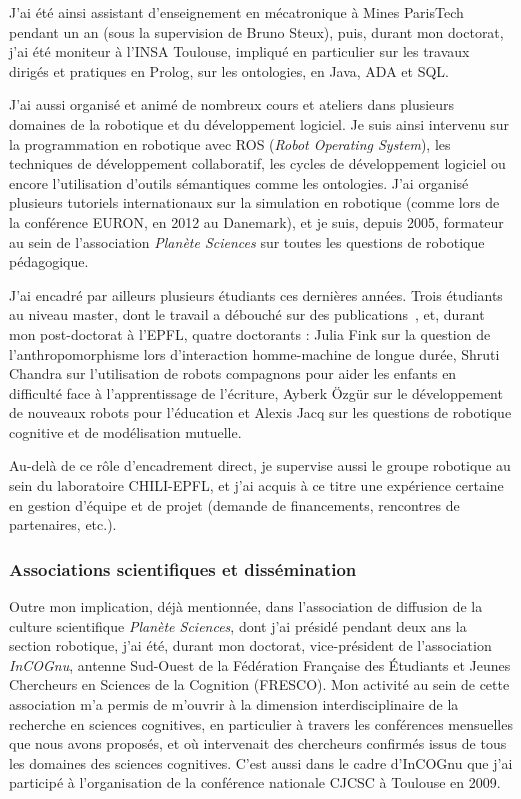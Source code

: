 \documentclass[a4paper]{article}
\begin{document}
J'ai été ainsi assistant d'enseignement en mécatronique à Mines ParisTech
pendant un an (sous la supervision de Bruno Steux), puis, durant mon doctorat,
j'ai été moniteur à l'INSA Toulouse, impliqué en particulier sur les travaux
dirigés et pratiques en Prolog, sur les ontologies, en Java, ADA et SQL.

J'ai aussi organisé et animé de nombreux cours et ateliers dans plusieurs
domaines de la robotique et du développement logiciel. Je suis ainsi intervenu
sur la programmation en robotique avec ROS (\emph{Robot Operating System}), les
techniques de développement collaboratif, les cycles de développement logiciel
ou encore l'utilisation d'outils sémantiques comme les ontologies. J'ai organisé
plusieurs tutoriels internationaux sur la simulation en robotique (comme lors de
la conférence EURON, en 2012 au Danemark), et je suis, depuis 2005, formateur au
sein de l'association \emph{Planète Sciences} sur toutes les questions de
robotique pédagogique.

J'ai encadré par ailleurs plusieurs étudiants ces dernières
années. Trois étudiants au niveau master, dont le travail a débouché sur des
publications~\cite{lemaignan2011grounding,hood2015when,hood2015cowriter}, et,
durant mon post-doctorat à l'EPFL, quatre doctorants : Julia Fink sur la question
de l'anthropomorphisme lors d'interaction homme-machine de longue durée, Shruti
Chandra sur l'utilisation de robots compagnons pour aider les enfants en
difficulté face à l'apprentissage de l'écriture, Ayberk Özgür sur le
développement de nouveaux robots pour l'éducation et Alexis Jacq sur les
questions de robotique cognitive et de modélisation mutuelle.

Au-delà de ce rôle d'encadrement direct, je supervise aussi le groupe robotique
au sein du laboratoire CHILI-EPFL, et j'ai acquis à ce titre une expérience
certaine en gestion d'équipe et de projet (demande de financements, rencontres
de partenaires, etc.).

\subsubsection*{Associations scientifiques et dissémination}

Outre mon implication, déjà mentionnée, dans l'association de diffusion de la
culture scientifique \emph{Planète Sciences}, dont j'ai présidé pendant deux ans
la section robotique, j'ai été, durant mon doctorat, vice-président de
l'association \emph{InCOGnu}, antenne Sud-Ouest de la Fédération Française des
Étudiants et Jeunes Chercheurs en Sciences de la Cognition (FRESCO). Mon
activité au sein de cette association m'a permis de m'ouvrir à la dimension
interdisciplinaire de la recherche en sciences cognitives, en particulier à
travers les conférences mensuelles que nous avons proposés, et où intervenait
des chercheurs confirmés issus de tous les domaines des sciences cognitives.
C'est aussi dans le cadre d'InCOGnu que j'ai participé à l'organisation de la
conférence nationale CJCSC à Toulouse en 2009.
\end{document}
